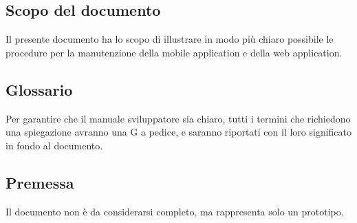 \documentclass[../manuale-sviluppatore.tex]{subfiles}
\begin{document}
\subsection{Scopo del documento}%
\label{sub:scopo_del_documento}
Il presente documento ha lo scopo di illustrare in modo più chiaro possibile le procedure per la manutenzione della mobile application e della web application.

\subsection{Glossario}%
\label{sub:glossario}
Per garantire che il manuale sviluppatore sia chiaro, tutti i termini che richiedono una spiegazione avranno una G a pedice, e saranno riportati con il loro significato in fondo al documento.

\subsection{Premessa}%
\label{sub:premessa}
Il documento non è da considerarsi completo, ma rappresenta solo un prototipo.
\end{document}
